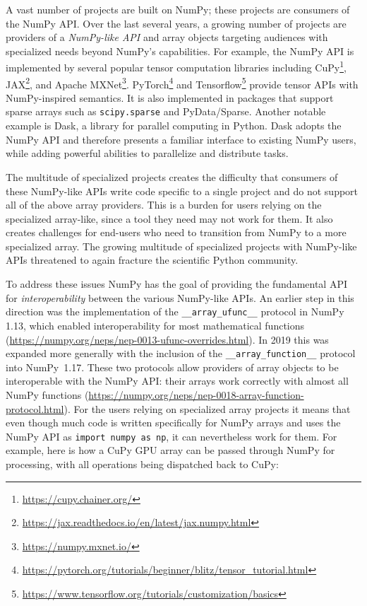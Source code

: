 A vast number of projects are built on NumPy;
these projects are consumers of the NumPy API.
Over the last several years, a growing number of projects are providers of
a \emph{NumPy-like API} and array objects targeting audiences with specialized
needs beyond NumPy's capabilities.
For example, the NumPy API is implemented by several popular tensor computation
libraries including CuPy\footnote{\url{https://cupy.chainer.org/}},
JAX\footnote{\url{https://jax.readthedocs.io/en/latest/jax.numpy.html}},
and Apache MXNet\footnote{\url{https://numpy.mxnet.io/}}.
PyTorch\footnote{\url{https://pytorch.org/tutorials/beginner/blitz/tensor\_tutorial.html}}
and Tensorflow\footnote{\url{https://www.tensorflow.org/tutorials/customization/basics}}
provide tensor APIs with NumPy-inspired semantics.
It is also implemented in packages that support sparse arrays
such as \texttt{scipy.sparse} and PyData/Sparse.
Another notable example is Dask, a library for parallel computing in
Python.  Dask adopts the NumPy API and therefore presents a familiar
interface to existing NumPy users, while adding powerful abilities to
parallelize and distribute tasks.

The multitude of specialized projects creates the difficulty that consumers
of these NumPy-like APIs write code specific to a single project and do not support
all of the above array providers.
This is a burden for users relying on the specialized array-like, since
a tool they need may not work for them.
It also creates challenges for end-users who need to transition
from NumPy to a more specialized array.
The growing multitude of specialized projects with NumPy-like APIs threatened
to again fracture the scientific Python community.

To address these issues NumPy has the goal of providing the fundamental
API for \emph{interoperability} between the various NumPy-like APIs.
An earlier step in this direction was the implementation of the
\texttt{\_\_array\_ufunc\_\_} protocol in NumPy 1.13, which enabled interoperability
for most mathematical functions (\url{https://numpy.org/neps/nep-0013-ufunc-overrides.html}).
In 2019 this was expanded more generally with the inclusion of the
\texttt{\_\_array\_function\_\_} protocol into NumPy~1.17.
These two protocols allow providers of array objects to be interoperable
with the NumPy API: their arrays work correctly with almost all NumPy
functions (\url{https://numpy.org/neps/nep-0018-array-function-protocol.html}).
For the users relying on specialized array projects it means that even though
much code is written specifically for NumPy arrays and uses the NumPy API as
\texttt{import numpy as np}, it can nevertheless work for them.
For example, here is how a CuPy GPU array can be passed through NumPy for
processing, with all operations being dispatched back to CuPy:

